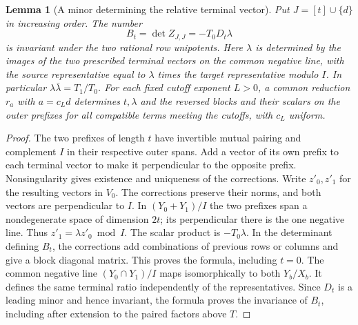 \documentclass[a4paper,11pt]{article}
\newtheorem{lemma}[proposition]{Lemma}
\theoremstyle{definition}
\theoremstyle{remark}
\numberwithin{equation}{section}
\begin{document}
\begin{lemma}[A minor determining the relative terminal vector]
\leavevmode\label{lem:borderminus645}
Put \(J=[t]\cup\{d\}\) in increasing order. The number
\[
 B_t=\det Z_{J,J}=-T_0D_t\lambda
\]
is invariant under the two rational row unipotents. Here
\(\lambda\) is determined by the images of the two prescribed
terminal vectors on the common negative line, with the source
representative equal to \(\lambda\) times the target representative
modulo \(I\). In particular \(\lambda\bar\lambda=T_1/T_0\).
For each fixed cutoff exponent \(L>0\), a common reduction
\(r_{a}\) with \(a=c_Ld\) determines \(t,\lambda\) and the
reversed blocks and their scalars on the outer prefixes for
all compatible terms meeting the cutoffs, with \(c_L\) uniform.
\end{lemma}
\begin{proof}
The two prefixes of length \(t\) have invertible mutual pairing
and complement \(I\) in their respective outer spans. Add a
vector of its own prefix to each terminal vector to make it
perpendicular to the opposite prefix. Nonsingularity gives
existence and uniqueness of the corrections. Write \(z'_0,z'_1\)
for the resulting vectors in \(V_0\). The corrections preserve
their norms, and both vectors are perpendicular to \(I\).
In \((Y_0+Y_1)/I\) the two prefixes span a nondegenerate
space of dimension \(2t\); its perpendicular there is the
one negative line. Thus \(z'_1=\lambda z'_0\bmod I\).
The scalar product is \(-T_0\lambda\). In the determinant
defining \(B_t\), the corrections add combinations of previous
rows or columns and give a block diagonal matrix. This proves
the formula, including \(t=0\). The common negative line
\((Y_0\cap Y_1)/I\) maps isomorphically to both \(Y_b/X_b\).
It defines the same terminal ratio independently of the
representatives. Since \(D_t\) is a leading minor and hence
invariant, the formula proves the invariance of \(B_t\),
including after extension to the paired factors above \(T\).


\end{proof}
\end{document}
